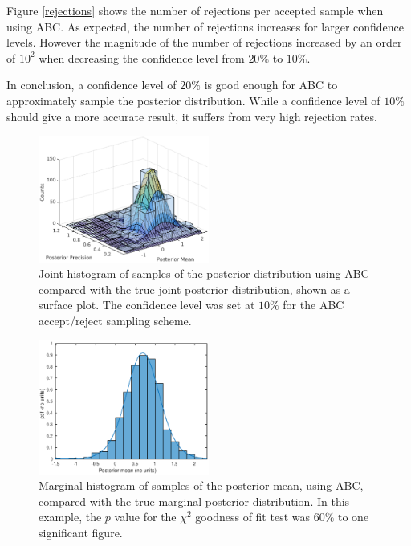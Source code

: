\documentclass[a4paper]{proc}
\begin{document}
Figure \ref{rejections} shows the number of rejections per accepted sample when using ABC. As expected, the number of rejections increases for larger confidence levels. However the magnitude of the number of rejections increased by an order of $10^2$ when decreasing the confidence level from  $20\%$ to $10\%$.

In conclusion, a confidence level of $20\%$ is good enough for ABC to approximately sample the posterior distribution. While a confidence level of $10\%$ should give a more accurate result, it suffers from very high rejection rates.

\begin{figure}
\includegraphics[width=0.5\textwidth]{surf.eps}
\caption{Joint histogram of samples of the posterior distribution using ABC compared with the true joint posterior distribution, shown as a surface plot. The confidence level was set at $10\%$ for the ABC accept/reject sampling scheme.}
\label{surf}
\end{figure}

\begin{figure}
\includegraphics[width=0.5\textwidth]{mean.eps}
\caption{Marginal histogram of samples of the posterior mean, using ABC, compared with the true marginal posterior distribution. In this example, the $p$ value for the $\chi^2$ goodness of fit test was $60\%$ to one significant figure.}
\label{mean}
\end{figure}
\end{document}
